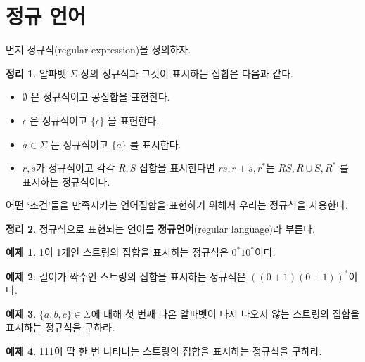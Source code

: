 \documentclass[b5paper]{book}
\theoremstyle{definition}
\newtheorem{thm}{정리}[chapter]
\newtheorem{ex}{예제}[chapter]
\begin{document}
\section{정규 언어}
먼저 정규식(regular expression)을 정의하자.
\begin{thm}
    알파벳 $\Sigma$ 상의 정규식과 그것이 표시하는 집합은 다음과 같다.
\begin{itemize}
    \item $\emptyset$ 은 정규식이고 공집합을 표현한다.
    \item $\epsilon$ 은 정규식이고 $\{\epsilon\}$ 을 표현한다.
    \item $a \in \Sigma$ 는 정규식이고 $\{a\}$ 를 표시한다.
    \item $r, s$가 정규식이고 각각 $R, S$ 집합을 표시한다면 
    $rs, r+s, r^*$는 $RS, R\cup S, R^* $ 를 표시하는 정규식이다. 
\end{itemize}
\end{thm}
어떤 `조건'들을 만족시키는 언어집합을 표현하기 위해서 우리는 정규식을 사용한다.
\begin{thm}
정규식으로 표현되는 언어를 \textbf{정규언어}(regular language)라
부른다.
\end{thm}
\begin{ex}
    1이 1개인 스트링의 집합을 표시하는 정규식은 $0^* 1 0^*$이다.
\end{ex}
\begin{ex}
  길이가 짝수인 스트링의 집합을 표시하는 정규식은 $((0+1)(0+1))^*$이다.  
\end{ex} 
\begin{ex}
$\{a, b, c\} \in \Sigma$에 대해 첫 번째 나온 알파벳이 다시 나오지 않는 
스트링의 집합을 표시하는 정규식을 구하라.
\end{ex}
\begin{ex}
111이 딱 한 번 나타나는 스트링의 집합을 표시하는 정규식을 구하라.
\end{ex}
\end{document}
